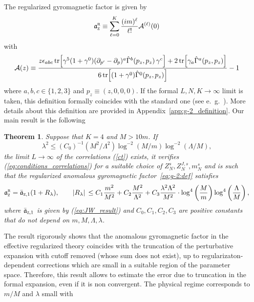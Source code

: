 \documentclass[a4paper, 11pt]{article}
\newcommand{\gyr}{\mathfrak{a}}								%
\newcommand{\rgyr}{\gyr_\textsc{z}^\textsc{r}}
\newcommand{\cutoff}{\Lambda}								%
\theoremstyle{thm}
\newtheorem{theorem}{Theorem}
\begin{document}
The regularized gyromagnetic factor is given by
\begin{equation}
\label{eq:g-2:def}
\rgyr \equiv \sum_{\ell = 0}^K \frac{(im)^\ell}{\ell!} \mathcal{A}^{(\ell)}(0)
\end{equation}
with
\begin{equation}
\label{eq:noncovariant_gfunction}
\mathcal{A}(z) \equiv \frac{z \epsilon_{abc} \tr[\gamma^5 (1 + \gamma^0) (\partial_{p'} - \partial_p)^a \hat{\Gamma}^b(p_z, p_z) \, \gamma^c] + 2 \tr[\gamma_a \hat{\Gamma}^a(p_z, p_z)]}{6 \tr[(1 + \gamma^0) \hat{\Gamma}^0(p_z, p_z)]} - 1
\end{equation}
where $a, b, c \in \lbrace 1, 2, 3 \rbrace$ and $p_z \equiv (z, 0, 0, 0)$. If the formal $L, N, K \to\infty$ limit is taken, this definition formally coincides with the standard one (see e.\ g.~\cite[Equation (6.37)]{Peskin_1995}). More details about this definition are provided in Appendix~\ref{app:g-2_definition}. 
Our main result is the following
\begin{theorem}
\label{th:main_theorem}
Suppose that $K=4$ and $M > 10m$. If
\begin{equation}
\lambda^2 \le  (C_0)^{-1} (M^2/\cutoff^2) \log^{-2}(M/m) \log^{-2}(\cutoff/M),
\end{equation}
the limit $L\to
\infty$ of the correlations (\ref{ct}) exists, it verifies (\ref{eq:conditions_correlations})
for a suitable choice of 
$Z^s_N, Z^{J, s}_N, m^s_N$ and is such that the regularized anomalous gyromagnetic factor~\eqref{eq:g-2:def} satisfies
\begin{equation}
\label{eq:final_result_remainder}
\rgyr = 
\bar{\gyr}_{\textsc{z},1}(1+R_\lambda), \qquad 
\abs*{R_\lambda} \le  C_1 \frac{m^2}{M^2} +C_2 \frac{M^2}{\cutoff^2} + C_3 \frac{\lambda^2\cutoff^2}{M^2} \cdot \log^4 \left(\frac{M}{m}\right) \log^4 \left( \frac{\cutoff}{M} \right),
\end{equation}
where $\bar{\gyr}_{\textsc{z},1}$ is given by (\ref{eq:JW_result}) and 
$C_0, C_1, C_2, C_3$ are positive constants that do not depend on $m, M, \cutoff, \lambda$.
\end{theorem}
%
The result rigorously shows that the anomalous gyromagnetic factor in the effective regularized theory coincides with the truncation of the perturbative expansion  with cutoff removed (whose sum does not exist), up to regularizaton-dependent corrections which are small in a suitable region of the parameter space. Therefore, this result allows to estimate the error due to truncation in the formal expansion, even if it is non convergent. The physical regime corresponds to $m/M$ and $\lambda$ small with 
\end{document}
